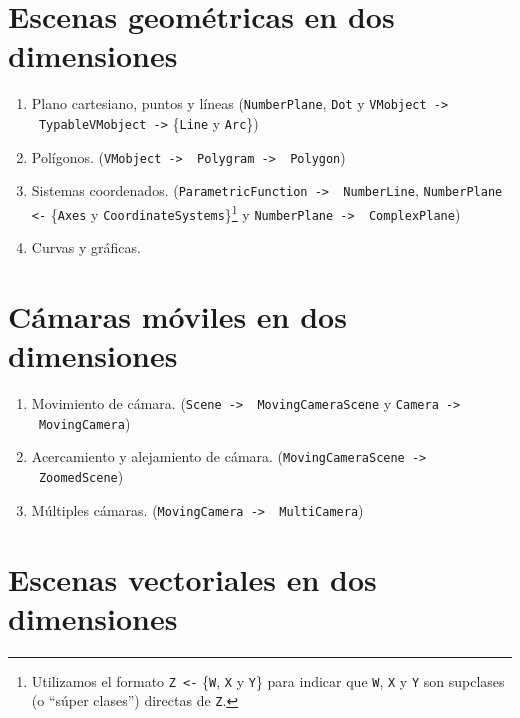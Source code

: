 \documentclass[a4paper]{article}
\begin{document}
\section{Escenas geométricas en dos dimensiones} \label{Sec: Escenas geométricas en dos dimensiones}

\begin{enumerate}

\item Plano cartesiano, puntos y líneas (\texttt{NumberPlane}, \texttt{Dot} y \texttt{VMobject -> \ TypableVMobject ->} \{\texttt{Line} y \texttt{Arc}\})

    \item Polígonos. (\texttt{VMobject -> \ Polygram -> \ Polygon})

    \item Sistemas coordenados. (\texttt{ParametricFunction -> \ NumberLine}, \texttt{NumberPlane <-} \{\texttt{Axes} y \texttt{CoordinateSystems}\}\footnote{Utilizamos el formato \texttt{Z <-} \{\texttt{W}, \texttt{X} y \texttt{Y}\} para indicar que \texttt{W}, \texttt{X} y \texttt{Y} son supclases (o ``súper clases'') directas de \texttt{Z}.} y \texttt{NumberPlane -> \ ComplexPlane})

    \item Curvas y gráficas.
\end{enumerate}

\section{Cámaras móviles en dos dimensiones} \label{Sec: Cámaras móviles en dos dimensiones}

\begin{enumerate}

    \item Movimiento de cámara. (\texttt{Scene -> \ MovingCameraScene} y \texttt{Camera -> \ MovingCamera})

    \item Acercamiento y alejamiento de cámara. (\texttt{MovingCameraScene -> \ ZoomedScene}) 

    \item Múltiples cámaras. (\texttt{MovingCamera -> \ MultiCamera})
\end{enumerate}

\section{Escenas vectoriales en dos dimensiones} \label{Sec: Escenas vectoriales en dos dimensiones}
\end{document}
